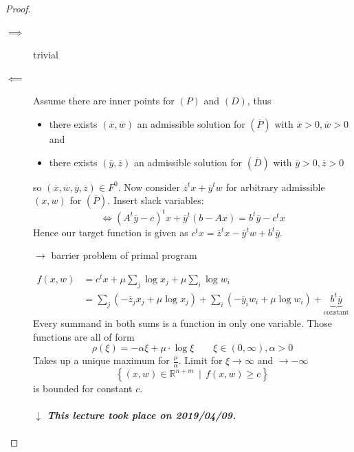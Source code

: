 \documentclass[a4paper]{article}
\newcounter{lecref}[section]
\numberwithin{lecref}{section}
\newtheorem{theorem}[lecref]{Theorem}
\newcommand{\SetDef}[2]{\left\{#1\,\mid\,#2\right\}}
\newcommand{\dateref}[1]{%
  \begin{mdframed}[backgroundcolor=gray!10,innerbottommargin=0pt,innertopmargin=0pt]
    \paragraph{\textit{$\downarrow$ This lecture took place on #1.}}%
  \end{mdframed}%
}
\begin{document}
\begin{proof}
	\begin{description}
		\item[$\mathbf \implies$] trivial
		\item[$\mathbf \impliedby$] Assume there are inner points for $(P)$ and $(D)$, thus
			\begin{itemize}
				\item there exists $(\overline x, \overline w)$ an admissible solution for $(\overline P)$ with $\overline x > 0, \overline w > 0$ and
				\item there exists $(\overline y, \overline z)$ an admissible solution for $(\overline D)$ with $\overline y > 0, \overline z > 0$
			\end{itemize}
			so $(\overline x, \overline w, \overline y, \overline z) \in F^0$.
			Now consider $\overline z^t x + \overline y^t w$ for arbitrary admissible $(x, w)$ for $(\overline P)$.
			Insert slack variables:
			\[ \iff (A^t \overline y - c)^t x + \overline y^t (b - Ax) = b^t \overline y - c^t x \]
			Hence our target function is given as $c^t x = \overline z^t x - \overline y^t w + b^t \overline y$.

			$\to$ barrier problem of primal program

			\begin{align*}
				f(x, w) &= c^t x + \mu \sum_j \log x_j + \mu \sum_i \log w_i \\
					&= \sum_j \left(- \overline z_j x_j + \mu \log x_j\right) + \sum_i \left(-\overline y_i w_i + \mu \log w_i\right) + \underbrace{b^t \overline y}_{\text{constant}}
			\end{align*}
			Every summand in both sums is a function in only one variable.
			Those functions are all of form
			\[ \rho(\xi) = -\alpha \xi + \mu \cdot \log \xi \qquad \xi \in (0, \infty), \alpha > 0 \]
			Takes up a unique maximum for $\frac \mu\alpha$. Limit for $\xi \to \infty$ and $\to -\infty$
			\[ \SetDef{(x, w) \in \mathbb R^{n + m}}{f(x, w) \geq c} \]
			is bounded for constant $c$.

			\dateref{2019/04/09}


\end{description}
\end{proof}
\end{document}
